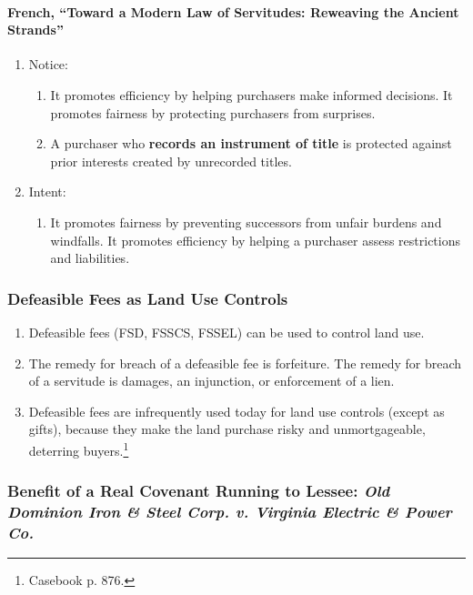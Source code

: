 \paragraph{French, ``Toward a Modern Law of Servitudes: Reweaving the Ancient 
Strands''}

\begin{enumerate}
    \item Notice:
    \begin{enumerate}
        \item It promotes efficiency by helping purchasers make informed 
        decisions. It promotes fairness by protecting purchasers from 
        surprises.
        \item A purchaser who \textbf{records an instrument of title} is 
        protected against prior interests created by unrecorded titles.
    \end{enumerate}
    \item Intent:
    \begin{enumerate}
        \item It promotes fairness by preventing successors from unfair 
        burdens and windfalls. It promotes efficiency by helping a purchaser 
        assess restrictions and liabilities.
    \end{enumerate}
\end{enumerate}

\subsubsection{Defeasible Fees as Land Use Controls}

\begin{enumerate}
    \item Defeasible fees (FSD, FSSCS, FSSEL) can be used to control land use.
    \item The remedy for breach of a defeasible fee is forfeiture. The remedy 
    for breach of a servitude is damages, an injunction, or enforcement of a 
    lien.
    \item Defeasible fees are infrequently used today for land use controls 
    (except as gifts), because they make the land purchase risky and 
    unmortgageable, deterring buyers.\footnote{Casebook p. 876.}
\end{enumerate}

\subsubsection{Benefit of a Real Covenant Running to Lessee: \emph{Old 
Dominion Iron \& Steel Corp. v. Virginia Electric \& Power Co.}}


